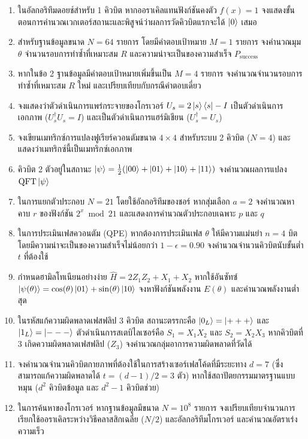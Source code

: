 \begin{enumerate}[label=\textbf{\arabic*.}]
    \item ในอัลกอริทึมดอยช์สำหรับ 1 คิวบิต หากออราเคิลแทนฟังก์ชันคงตัว $f(x) = 1$ จงแสดงขั้นตอนการคำนวณเวกเตอร์สถานะและพิสูจน์ว่าผลการวัดคิวบิตแรกจะได้ $\ket{0}$ เสมอ
    \item สำหรับฐานข้อมูลขนาด $N = 64$ รายการ โดยมีคำตอบเป้าหมาย $M = 1$ รายการ จงคำนวณมุม $\theta$ จำนวนรอบการทำซ้ำที่เหมาะสม $R$ และความน่าจะเป็นของความสำเร็จ $P_{\text{success}}$
    \item หากในข้อ 2 ฐานข้อมูลมีคำตอบเป้าหมายเพิ่มขึ้นเป็น $M = 4$ รายการ จงคำนวณจำนวนรอบการทำซ้ำที่เหมาะสม $R$ ใหม่ และเปรียบเทียบกับกรณีคำตอบเดี่ยว
    \item จงแสดงว่าตัวดำเนินการแพร่กระจายของโกรเวอร์ $U_s = 2\ket{s}\bra{s}-I$ เป็นตัวดำเนินการเอกภาพ ($U_s^\dagger U_s = I$) และเป็นตัวดำเนินการแฮร์มิเชียน ($U_s^\dagger = U_s$)
    \item จงเขียนเมทริกซ์การแปลงฟูเรียร์ควอนตัมขนาด $4 \times 4$ สำหรับระบบ 2 คิวบิต ($N=4$) และแสดงว่าเมทริกซ์นี้เป็นเมทริกซ์เอกภาพ
    \item คิวบิต 2 ตัวอยู่ในสถานะ $\ket{\psi} = \frac{1}{2}(\ket{00} + \ket{01} + \ket{10} + \ket{11})$ จงคำนวณผลการแปลง $\text{QFT}\ket{\psi}$
    \item ในการแยกตัวประกอบ $N = 21$ โดยใช้อัลกอริทึมของชอร์ หากสุ่มเลือก $a = 2$ จงคำนวณหาคาบ $r$ ของฟังก์ชัน $2^x \bmod 21$ และแสดงการคำนวณตัวประกอบเฉพาะ $p$ และ $q$
    \item ในการประเมินเฟสควอนตัม (QPE) หากต้องการประเมินเฟส $\theta$ ให้มีความแม่นยำ $n = 4$ บิต โดยมีความน่าจะเป็นของความสำเร็จไม่น้อยกว่า $1 - \epsilon = 0.90$ จงคำนวณจำนวนคิวบิตนับขั้นต่ำ $t$ ที่ต้องใช้
    \item กำหนดฮามิลโทเนียนอย่างง่าย $\hat{H} = 2 Z_1 Z_2 + X_1 + X_2$ หากใช้อันซัทซ์ $\ket{\psi(\theta)} = \cos(\theta)\ket{01} + \sin(\theta)\ket{10}$ จงหาฟังก์ชันพลังงาน $E(\theta)$ และคำนวณพลังงานต่ำสุด
    \item ในรหัสแก้ความผิดพลาดเฟสฟลิป 3 คิวบิต สถานะตรรกะคือ $\ket{0_L} = \ket{+++}$ และ $\ket{1_L} = \ket{---}$ ตัวดำเนินการสเตบิไลเซอร์คือ $S_1 = X_1 X_2$ และ $S_2 = X_2 X_3$ หากคิวบิตที่ 3 เกิดความผิดพลาดเฟสฟลิป ($Z_3$) จงคำนวณกลุ่มอาการความผิดพลาดที่วัดได้
    \item จงคำนวณจำนวนคิวบิตกายภาพที่ต้องใช้ในการสร้างเซอร์เฟสโค้ดที่มีระยะทาง $d = 7$ (ซึ่งสามารถแก้ความผิดพลาดได้ $t = (d-1)/2 = 3$ ตัว) หากใช้สถาปัตยกรรมมาตรฐานแบบหมุน ($d^2$ คิวบิตข้อมูล และ $d^2-1$ คิวบิตช่วย)
    \item ในการค้นหาของโกรเวอร์ หากฐานข้อมูลมีขนาด $N = 10^8$ รายการ จงเปรียบเทียบจำนวนการเรียกใช้ออราเคิลระหว่างวิธีคลาสสิกเฉลี่ย ($N/2$) และอัลกอริทึมโกรเวอร์ และคำนวณอัตราเร่งความเร็ว

\end{enumerate}
